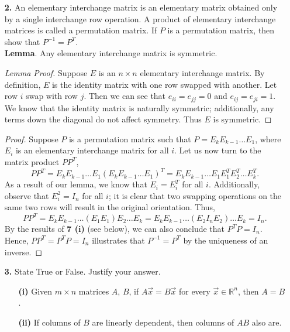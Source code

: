 \documentclass[ 12pt ]{article}
\begin{document}
\begin{enumerate}
	\item[\textbf{2.}] An elementary interchange matrix is an elementary matrix obtained only by a single interchange row operation. A product of elementary interchange
		matrices is called a permutation matrix. If $P$ is a permutation matrix, then show that $P^{-1} = P^T$. \\

		\textbf{Lemma}. Any elementary interchange matrix is symmetric.

		\begin{proof}[Lemma Proof]
			Suppose $E$ is an $n \times n$ elementary interchange matrix. By definition, $E$ is the identity matrix with one row swapped with another. Let row $i$ swap with
			row $j$. Then we can see that $e_{ii} = e_{jj} = 0$ and $e_{ij} = e_{ji} = 1$. We know that the identity matrix is naturally symmetric; additionally, any terms
			down the diagonal do not affect symmetry. Thus $E$ is symmetric.
		\end{proof}

		\begin{proof}
			Suppose $P$ is a permutation matrix such that $P = E_k E_{k-1} \hdots E_1$, where $E_i$ is an elementary interchange matrix for all $i$. Let us now turn to the
			matrix product
			$PP^T$, $$PP^T = E_k E_{k-1} \hdots E_1 (E_k E_{k-1} \hdots E_1)^T = E_k E_{k-1} \hdots E_1 E_1^T E_2^T \hdots E_k^T.$$ As a result of our lemma, we know that
			$E_i = E_i^T$ for all $i$. Additionally, observe that $E_i^2 = I_n$ for all $i$; it is clear that two swapping operations on the same two rows will result in the
			original orientation. Thus, $$PP^T =  E_k E_{k-1} \hdots (E_1 E_1) E_2 \hdots E_k = E_k E_{k-1} \hdots (E_2 I_n E_2) \hdots E_k = I_n.$$ By the results of
			\textbf{7 (i)} (see below), we can also conclude that $P^TP = I_n$. Hence, $PP^T = P^TP = I_n$ illustrates that $P^{-1} = P^T$ by the uniqueness of an inverse.
		\end{proof}


	\item[\textbf{3.}] State True or False. Justify your answer.
		\begin{enumerate}
			\item[\textbf{(i)}] Given $m \times n$ matrices $A$, $B$, if $A\vec{x} = B\vec{x}$ for every $\vec{x} \in \mathbb{R}^n$, then $A = B$.
			\item[\textbf{(ii)}] If columns of $B$ are linearly dependent, then columns of $AB$ also are.
		\end{enumerate}


\end{enumerate}
\end{document}
